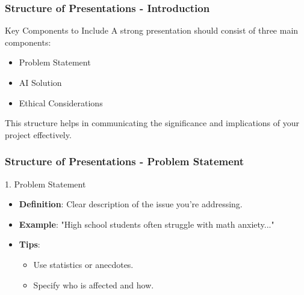 \documentclass{beamer}
\begin{document}
\begin{frame}[fragile]
    \frametitle{Structure of Presentations - Introduction}
    \begin{block}{Key Components to Include}
        A strong presentation should consist of three main components:
        \begin{itemize}
            \item Problem Statement
            \item AI Solution
            \item Ethical Considerations
        \end{itemize}
        This structure helps in communicating the significance and implications of your project effectively.
    \end{block}
\end{frame}

\begin{frame}[fragile]
    \frametitle{Structure of Presentations - Problem Statement}
    \begin{block}{1. Problem Statement}
        \begin{itemize}
            \item \textbf{Definition}: Clear description of the issue you're addressing.
            \item \textbf{Example}: "High school students often struggle with math anxiety..."
            \item \textbf{Tips}:
            \begin{itemize}
                \item Use statistics or anecdotes.
                \item Specify who is affected and how.
            \end{itemize}
        \end{itemize}
    \end{block}
\end{frame}
\end{document}
